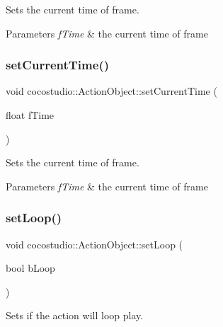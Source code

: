 Sets the current time of frame.


\begin{DoxyParams}{Parameters}
{\em f\+Time} & the current time of frame \\
\hline
\end{DoxyParams}
\mbox{\label{classcocostudio_1_1ActionObject_a031f6e35417d37f74d303c816284c11f}} 
\subsubsection{\texorpdfstring{set\+Current\+Time()}{setCurrentTime()}\hspace{0.1cm}{\footnotesize\ttfamily [2/2]}}
{\footnotesize\ttfamily void cocostudio\+::\+Action\+Object\+::set\+Current\+Time (\begin{DoxyParamCaption}\item[{float}]{f\+Time }\end{DoxyParamCaption})}

Sets the current time of frame.


\begin{DoxyParams}{Parameters}
{\em f\+Time} & the current time of frame \\
\hline
\end{DoxyParams}
\mbox{\label{classcocostudio_1_1ActionObject_a188046afbabf20869af3aaef2762e4e2}} 
\subsubsection{\texorpdfstring{set\+Loop()}{setLoop()}\hspace{0.1cm}{\footnotesize\ttfamily [1/2]}}
{\footnotesize\ttfamily void cocostudio\+::\+Action\+Object\+::set\+Loop (\begin{DoxyParamCaption}\item[{bool}]{b\+Loop }\end{DoxyParamCaption})}

Sets if the action will loop play.


